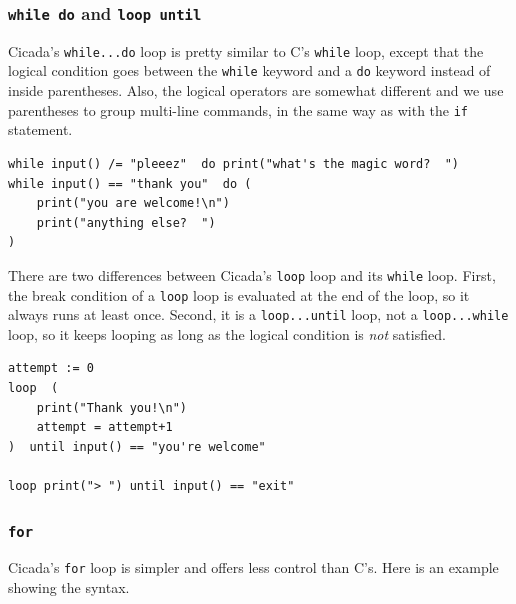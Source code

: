 \documentclass{article}
\newenvironment{code}{
       \begin{list}{}{
               \setlength{\leftmargin}{.4in}
               \setlength{\rightmargin}{0in}
               \setlength{\topsep}{.2in}
       }
       \small
       \item[] }
       { \end{list}   }
\begin{document}
\subsubsection{\texttt{while do} and \texttt{loop until}}   

Cicada's \verb#while...do# loop is pretty similar to C's \verb#while# loop, except that the logical condition goes between the \verb#while# keyword and a \verb#do# keyword instead of inside parentheses.  Also, the logical operators are somewhat different and we use parentheses to group multi-line commands, in the same way as with the \texttt{if} statement.

\begin{code} \begin{verbatim}
while input() /= "pleeez"  do print("what's the magic word?  ")
while input() == "thank you"  do (
    print("you are welcome!\n")
    print("anything else?  ")
)
\end{verbatim} \end{code}

There are two differences between Cicada's \texttt{loop} loop and its \verb#while# loop.  First, the break condition of a \texttt{loop} loop is evaluated at the end of the loop, so it always runs at least once.  Second, it is a \verb#loop...until# loop, not a \verb#loop...while# loop, so it keeps looping as long as the logical condition is \emph{not} satisfied.

\begin{code} \begin{verbatim}
attempt := 0
loop  (
    print("Thank you!\n")
    attempt = attempt+1
)  until input() == "you're welcome"

loop print("> ") until input() == "exit"
\end{verbatim} \end{code}




\subsubsection{\texttt{for}} 

Cicada's \texttt{for} loop is simpler and offers less control than C's.  Here is an example showing the syntax.
\end{document}
